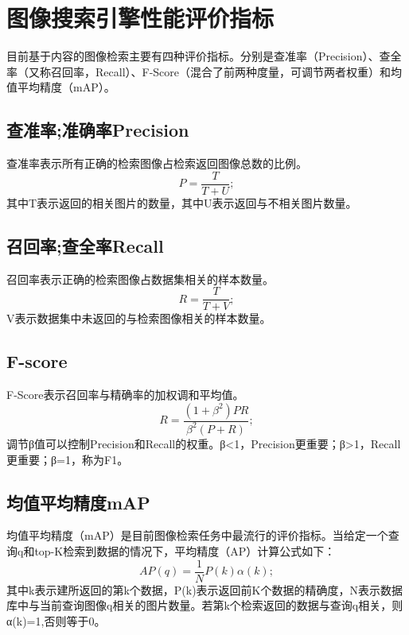 \documentclass[bachelor_p]{hdu-thesis}
\begin{document}
\section{图像搜索引擎性能评价指标}

目前基于内容的图像检索主要有四种评价指标。分别是查准率（Precision）、查全率（又称召回率，Recall）、F-Score（混合了前两种度量，可调节两者权重）和均值平均精度（mAP）。

\subsection{查准率;准确率Precision}

查准率表示所有正确的检索图像占检索返回图像总数的比例。
\begin{equation}
  P = \frac{T}{T+U};
\end{equation}
其中T表示返回的相关图片的数量，其中U表示返回与不相关图片数量。

\subsection{召回率;查全率Recall}

召回率表示正确的检索图像占数据集相关的样本数量。
\begin{equation}
  R = \frac{T}{T+V};
\end{equation}
V表示数据集中未返回的与检索图像相关的样本数量。

\subsection{F-score}

F-Score表示召回率与精确率的加权调和平均值。
\begin{equation}
  R = \frac{(1+\beta^2)PR}{\beta^2(P+R)};
\end{equation}
调节β值可以控制Precision和Recall的权重。β<1，Precision更重要；β>1，Recall更重要；β=1，称为F1。

\subsection{均值平均精度mAP}

均值平均精度（mAP）是目前图像检索任务中最流行的评价指标。当给定一个查询q和top-K检索到数据的情况下，平均精度（AP）计算公式如下：
\begin{equation}
  AP(q) = \frac{1}{N}P(k)\alpha(k);
\end{equation}
其中k表示建所返回的第k个数据，P(k)表示返回前K个数据的精确度，N表示数据库中与当前查询图像q相关的图片数量。若第k个检索返回的数据与查询q相关，则α(k)=1,否则等于0。
\end{document}
